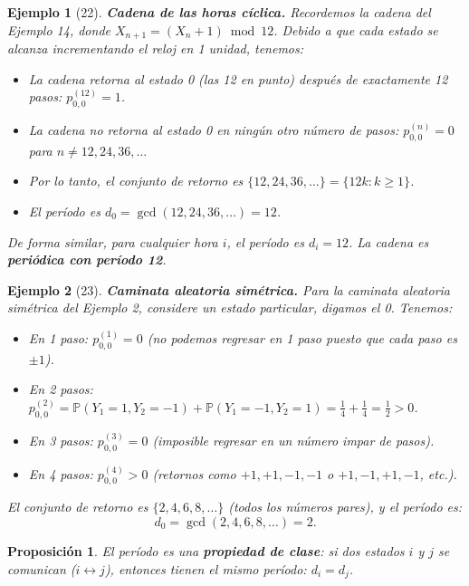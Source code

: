 \documentclass[12pt]{book}
\newtheorem{proposition}{Proposición}[chapter]
\newtheorem{example}{Ejemplo}[chapter]
\begin{document}
\begin{example}[22]
\textbf{Cadena de las horas cíclica.} Recordemos la cadena del Ejemplo 14, donde $X_{n+1} = (X_n + 1) \bmod 12$. Debido a que cada estado se alcanza incrementando el reloj en 1 unidad, tenemos:
\begin{itemize}
    \item La cadena retorna al estado 0 (las 12 en punto) después de exactamente 12 pasos: $p_{0,0}^{(12)} = 1$.
    \item La cadena no retorna al estado 0 en ningún otro número de pasos: $p_{0,0}^{(n)} = 0$ para $n \neq 12, 24, 36, \ldots$
    \item Por lo tanto, el conjunto de retorno es $\{12, 24, 36, \ldots\} = \{12k : k \geq 1\}$.
    \item El período es $d_0 = \gcd(12, 24, 36, \ldots) = 12$.
\end{itemize}

De forma similar, para cualquier hora $i$, el período es $d_i = 12$. La cadena es \textbf{periódica con período 12}.
\end{example}

\begin{example}[23]
\textbf{Caminata aleatoria simétrica.} Para la caminata aleatoria simétrica del Ejemplo 2, considere un estado particular, digamos el 0. Tenemos:
\begin{itemize}
    \item En 1 paso: $p_{0,0}^{(1)} = 0$ (no podemos regresar en 1 paso puesto que cada paso es $\pm 1$).
    \item En 2 pasos: $p_{0,0}^{(2)} = \mathbb{P}(Y_1 = 1, Y_2 = -1) + \mathbb{P}(Y_1 = -1, Y_2 = 1) = \frac{1}{4} + \frac{1}{4} = \frac{1}{2} > 0$.
    \item En 3 pasos: $p_{0,0}^{(3)} = 0$ (imposible regresar en un número impar de pasos).
    \item En 4 pasos: $p_{0,0}^{(4)} > 0$ (retornos como $+1, +1, -1, -1$ o $+1, -1, +1, -1$, etc.).
\end{itemize}

El conjunto de retorno es $\{2, 4, 6, 8, \ldots\}$ (todos los números pares), y el período es:
\[
d_0 = \gcd(2, 4, 6, 8, \ldots) = 2.
\]
\end{example}

\begin{proposition}
El período es una \textbf{propiedad de clase}: si dos estados $i$ y $j$ se comunican ($i \leftrightarrow j$), entonces tienen el mismo período: $d_i = d_j$.
\end{proposition}
\end{document}
